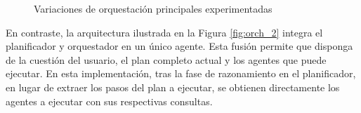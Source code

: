 \begin{figure}[hbtp]
\centering
{}
\hfill
{}
\hfill
{}
\caption{Variaciones de orquestación principales experimentadas}
\label{fig:orchs}
\end{figure}

En contraste, la arquitectura ilustrada en la Figura \ref{fig:orch_2} integra el planificador y orquestador en un único agente. Esta fusión permite que disponga de la cuestión del usuario, el plan completo actual y los agentes que puede ejecutar. En esta implementación, tras la fase de razonamiento en el planificador, en lugar de extraer los pasos del plan a ejecutar, se obtienen directamente los agentes a ejecutar con sus respectivas consultas.

